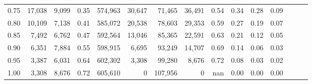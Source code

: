 \begin{tabular}{rrrrrrrrrrrrrrr}
0.75 &  17,038 &  9,099 &  0.35 &  574,963 &   30,647 &   71,465 &   36,491 &  0.54 &  0.34 &  0.28 &      0.09 \\
0.80 &  10,109 &  7,138 &  0.41 &  585,072 &   20,538 &   78,603 &   29,353 &  0.59 &  0.27 &  0.19 &      0.07 \\
0.85 &   7,492 &  6,762 &  0.47 &  592,564 &   13,046 &   85,365 &   22,591 &  0.63 &  0.21 &  0.12 &      0.05 \\
0.90 &   6,351 &  7,884 &  0.55 &  598,915 &    6,695 &   93,249 &   14,707 &  0.69 &  0.14 &  0.06 &      0.03 \\
0.95 &   3,387 &  6,031 &  0.64 &  602,302 &    3,308 &   99,280 &    8,676 &  0.72 &  0.08 &  0.03 &      0.02 \\
1.00 &   3,308 &  8,676 &  0.72 &  605,610 &        0 &  107,956 &        0 &   nan &  0.00 &  0.00 &      0.00 \\
\bottomrule
\end{tabular}
